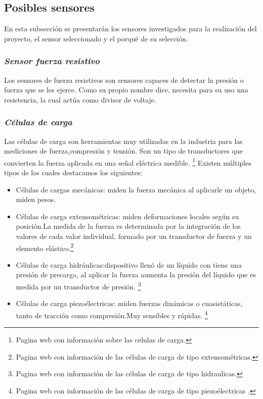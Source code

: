 \subsection{Posibles sensores}
En esta subsección se presentarán los sensores investigados para la realización del proyecto, el sensor seleccionado y el porqué de su selección.
\subsubsection{\textit{{Sensor fuerza resistivo}}}
Los sensores de fuerza resistivos son sensores capaces de detectar la presión o fuerza que se les ejerce.
Como su propio nombre dice, necesita para su uso una resistencia, la cual actúa como divisor de voltaje.
\subsubsection{\textit{{Células de carga}}}
Las células de carga son herramientas muy utilizadas en la industria para las mediciones de fuerza,compresión y tensión.
Son un tipo de transductores que convierten la fuerza aplicada  en una señal eléctrica medible. \cite{Celula_Carga}\footnote{Pagina web con información sobre las celulas de carga\cite{Celula_Carga}.}
Existen múltiples tipos de los cuales destacamos los siguientes:
    \begin{itemize}
        \item Células de cargas mecánicas: miden la fuerza mecánica al aplicarle un objeto, miden pesos.
        \item Células de carga extensométricas: miden deformaciones locales según su posición.La medida de la fuerza es determinada por la integración de los valores de cada valor individual, formado por un transductor de fuerza y un elemento elástico.\cite{celulas_extensométricas}\footnote{Pagina web con información de las células de carga de tipo extensométricas\cite{celulas_extensométricas}.}
        \item Células de carga hidráulicas:dispositivo llenó de un líquido con tiene una presión de precarga, al aplicar la fuerza aumenta la presión del líquido que es medida por un transductor de presión.
        \cite{Celulas_hidraulicas}\footnote{Pagina web con información de las células de carga de tipo hidraulicas\cite{Celulas_hidraulicas}.}
        \item Células de carga piezoélectricas: miden fuerzas dinámicas o cuasistáticas, tanto de tracción como compresión.Muy sensibles y rápidas.
        \cite{Celulas_piezoelectricas}\footnote{Pagina web con información de las células de carga de tipo piezoélectricas \cite{Celulas_piezoelectricas}.}
    \end{itemize}
